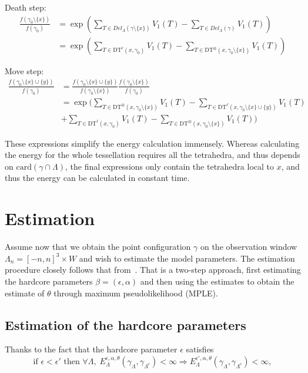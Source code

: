 \documentclass[12pt,a4paper]{report}
\begin{document}
Death step:
\begin{align*}
\frac{f(\gamma_0 \setminus \{x\})}{f(\gamma_0)}&= \exp\left({\sum_{T\in Del_\Lambda(\gamma \setminus \{x\})} V_1(T)- \sum_{T \in Del_\Lambda(\gamma)}V_1(T)}\right)\\
&= \exp\left( \sum_{T\in \text{DT}^\ell (x,\gamma_0)} V_1(T) - \sum_{T \in \text{DT}^\otimes (x,\gamma_0 \setminus \{x\})} V_1(T)   \right)
\end{align*}

Move step:
\begin{align*}
\frac{f(\gamma_0 \setminus \{x\} \cup \{y\})}{f(\gamma_0)}&= 
\frac{f(\gamma_0 \setminus \{x\} \cup \{y\})}{f(\gamma_0\setminus\{x\})} \frac{f(\gamma_0\setminus\{x\})}{f(\gamma_0)} \\ 
&= \exp \Bigg(  \sum_{T \in \text{DT}^\otimes (x,\gamma_0\setminus\{x\})} V_1(T)  - \sum_{T\in \text{DT}^\ell (x,\gamma_0\setminus\{x\}\cup\{y\})} V_1(T)  \\
&+ \sum_{T\in \text{DT}^\ell (x,\gamma_0)} V_1(T) - \sum_{T \in \text{DT}^\otimes (x,\gamma_0\setminus\{x\})} V_1(T)   
\Bigg)
\end{align*}



These expressions simplify the energy calculation immensely. Whereas calculating the energy for the whole tessellation requires all the tetrahedra, and thus depends on $\text{card}(\gamma\cap\Lambda)$, the final expressions only contain the tetrahedra local to $x$, and thus the energy can be calculated in constant time.



\section{Estimation}

Assume now that we obtain the point configuration $\gamma$ on the observation window $\Lambda_n = [-n,n]^3\times W$ and wish to estimate the model parameters.
The estimation procedure closely follows that from~\cite{DL10}. That is a two-step approach, first estimating the hardcore parameters $\beta = (\epsilon,\alpha)$ and then using the estimates to obtain the estimate of $\theta$ through maximum pseudolikelihood (MPLE). 
\subsection{Estimation of the hardcore parameters}
Thanks to the fact that the hardcore parameter $\epsilon$ satisfies
$$ \text{if } \epsilon < \epsilon' \text{ then  } \forall \Lambda, \; E^{\epsilon, \alpha,\theta}_\Lambda(\gamma_\Lambda,\gamma_{\Lambda^c}) < \infty \Rightarrow  E^{\epsilon',\alpha,\theta}_\Lambda(\gamma_\Lambda,\gamma_{\Lambda^c})<\infty,$$ 
\end{document}
